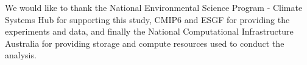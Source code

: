 \documentclass[draft]{agujournal2019}
\begin{document}
\acknowledgments
We would like to thank the National Environmental Science Program - Climate Systems Hub for supporting this study, CMIP6 and ESGF for providing the experiments and data, and finally the National Computational Infrastructure Australia for providing storage and compute resources used to conduct the analysis.


%
%





%
%
%
%
%
\end{document}
